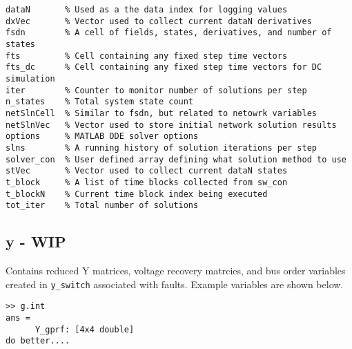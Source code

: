 \begin{verbatim}
dataN       % Used as a the data index for logging values
dxVec       % Vector used to collect current dataN derivatives
fsdn        % A cell of fields, states, derivatives, and number of states
fts         % Cell containing any fixed step time vectors
fts_dc      % Cell containing any fixed step time vectors for DC simulation
iter        % Counter to monitor number of solutions per step
n_states    % Total system state count
netSlnCell  % Similar to fsdn, but related to netowrk variables
netSlnVec   % Vector used to store initial network solution results
options     % MATLAB ODE solver options
slns        % A running history of solution iterations per step
solver_con  % User defined array defining what solution method to use
stVec       % Vector used to collect current dataN states
t_block     % A list of time blocks collected from sw_con
t_blockN    % Current time block index being executed
tot_iter    % Total number of solutions
\end{verbatim}

\subsection{y - WIP}  
Contains reduced Y matrices, voltage recovery matrcies, and bus order variables created in \verb|y_switch| associated with faults.
Example variables are shown below.
\begin{verbatim}
>> g.int
ans = 
      Y_gprf: [4x4 double]
do better....
\end{verbatim}

\begin{comment}

template for subparagraphs

\subsection{xxx} %
\begin{verbatim}

\end{verbatim}

\end{comment}